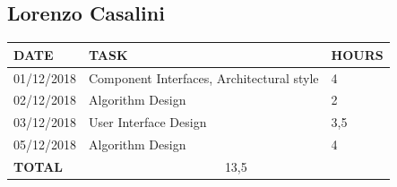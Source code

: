 \documentclass[12pt]{article}
\begin{document}
\subsection{Lorenzo Casalini}

\begin{center}
\begin{tabular}{ |p{}|p{}|p{}| } 
 \hline
 \textbf{DATE} & \textbf{TASK} & \textbf{HOURS} \\ 
  \hline
 01/12/2018 & Component Interfaces, Architectural style & 4\\
 \hline 
 02/12/2018 & Algorithm Design & 2 \\
 \hline
 03/12/2018 & User Interface Design & 3,5\\ 
 \hline 
 05/12/2018 & Algorithm Design & 4\\
  
  \hline
  \textbf{TOTAL} & \multicolumn{2}{c|}{13,5} \\ 
  \hline
\end{tabular}
\end{center}
\end{document}
